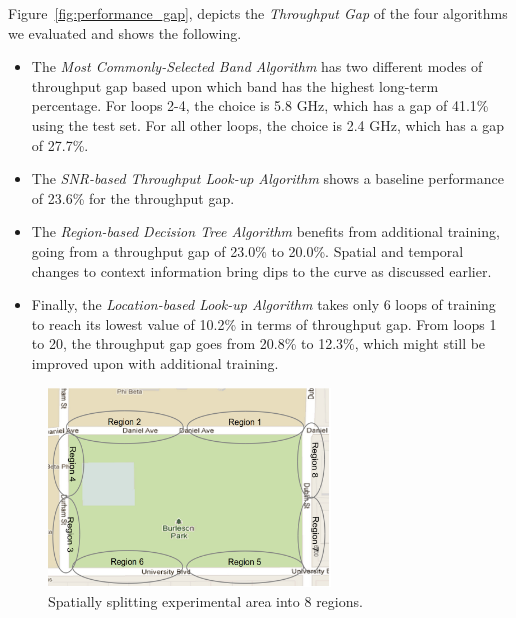 Figure~\ref{fig:performance_gap}, 
depicts the \emph{Throughput Gap} of the four algorithms we evaluated and shows the following.

\begin{itemize}
\item
The \emph{Most Commonly-Selected Band Algorithm} has two different modes
of throughput gap based upon which band has the highest long-term 
percentage.  For loops 2-4, the choice is 5.8 GHz, which has a gap of 
41.1\% using the test set. For all other loops, the choice is 2.4 GHz, 
which has a gap of 27.7\%. 
\item 
The \emph{SNR-based Throughput Look-up Algorithm} shows a baseline  
performance of 23.6\% for the throughput gap.
\item 
The \emph{Region-based Decision Tree Algorithm} benefits from
additional training, going from a throughput gap of 23.0\% to 20.0\%.
Spatial and temporal changes to context information bring dips
to the curve as discussed earlier.
\item
Finally, the \emph{Location-based Look-up Algorithm} takes only 6 loops
of training to reach its lowest value of 10.2\% in terms of throughput
gap. From loops 1 to 20, the throughput gap goes from 20.8\% to 12.3\%,
which might still be improved upon with additional training.
\end{itemize}

\begin{figure}
\centering
\includegraphics[width=75mm]{figures/region_map}
\vspace{-0.1in}
\caption{Spatially splitting experimental area into 8 regions.}
\label{fig:region map}
\end{figure}

